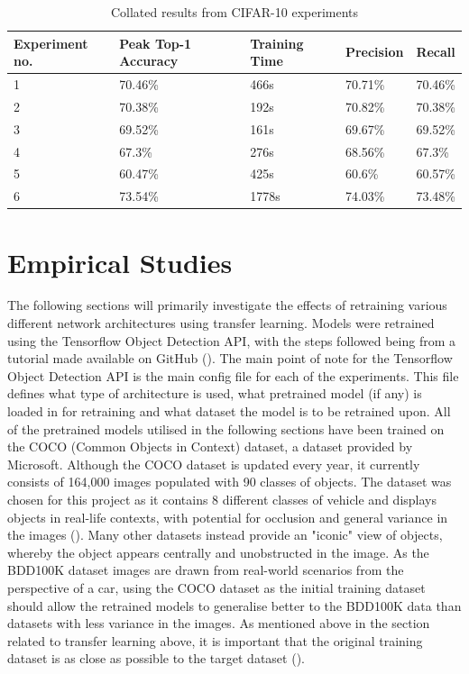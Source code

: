 \documentclass[12pt]{report}
\begin{document}
\begin{table}[th!]
\begin{tabular}{|l|l|l|l|l|}
\hline
Experiment no. & Peak Top-1 Accuracy & Training Time & Precision & Recall  \\ \hline
1              & 70.46\%             & 466s          & 70.71\%   & 70.46\% \\ \hline
2              & 70.38\%             & 192s          & 70.82\%   & 70.38\% \\ \hline
3              & 69.52\%             & 161s          & 69.67\%   & 69.52\% \\ \hline
4              & 67.3\%              & 276s          & 68.56\%   & 67.3\%  \\ \hline
5              & 60.47\%             & 425s          & 60.6\%    & 60.57\% \\ \hline
6              & 73.54\%             & 1778s         & 74.03\%   & 73.48\% \\ \hline
\end{tabular}
\caption{Collated results from CIFAR-10 experiments}
\label{cifar-results}
\end{table}

\newpage
\chapter{Empirical Studies}
\begin{flushleft}
The following sections will primarily investigate the effects of retraining various different network architectures using transfer learning. Models were retrained using the Tensorflow Object Detection API, with the steps followed being from a tutorial made available on GitHub (\cite{tutorial}). The main point of note for the Tensorflow Object Detection API is the main config file for each of the experiments. This file defines what type of architecture is used, what pretrained model (if any) is loaded in for retraining and what dataset the model is to be retrained upon. All of the pretrained models utilised in the following sections have been trained on the COCO (Common Objects in Context) dataset, a dataset provided by Microsoft. Although the COCO dataset is updated every year, it currently consists of 164,000 images populated with 90 classes of objects. The dataset was chosen for this project as it contains 8 different classes of vehicle and displays objects in real-life contexts, with potential for occlusion and general variance in the images (\cite{lin2014microsoft}). Many other datasets instead provide an "iconic" view of objects, whereby the object appears centrally and unobstructed in the image. As the BDD100K dataset images are drawn from real-world scenarios from the perspective of a car, using the COCO dataset as the initial training dataset should allow the retrained models to generalise better to the BDD100K data than datasets with less variance in the images. As mentioned above in the section related to transfer learning above, it is important that the original training dataset is as close as possible to the target dataset (\cite{tan2018survey}).
\end{flushleft}
\end{document}
